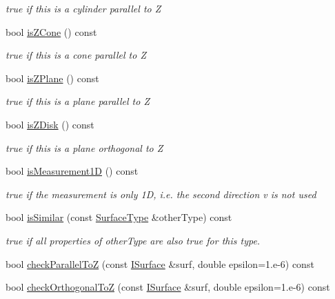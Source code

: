 \begin{DoxyCompactItemize}
\begin{DoxyCompactList}\small\item\em true if this is a cylinder parallel to Z \item\end{DoxyCompactList}\item 
bool \hyperlink{class_d_d_surfaces_1_1_surface_type_a545a4725a93ede9b1d5cab3cb3e55bf1}{isZCone} () const 
\begin{DoxyCompactList}\small\item\em true if this is a cone parallel to Z \item\end{DoxyCompactList}\item 
bool \hyperlink{class_d_d_surfaces_1_1_surface_type_ab440e93ce5a0bd8412d6cacd4e575321}{isZPlane} () const 
\begin{DoxyCompactList}\small\item\em true if this is a plane parallel to Z \item\end{DoxyCompactList}\item 
bool \hyperlink{class_d_d_surfaces_1_1_surface_type_a02a7fe9ec9f7ad6ebd98b0a1b36a39b3}{isZDisk} () const 
\begin{DoxyCompactList}\small\item\em true if this is a plane orthogonal to Z \item\end{DoxyCompactList}\item 
bool \hyperlink{class_d_d_surfaces_1_1_surface_type_accd1fdafbf7d6235ec1945af6347043a}{isMeasurement1D} () const 
\begin{DoxyCompactList}\small\item\em true if the measurement is only 1D, i.e. the second direction v is not used \item\end{DoxyCompactList}\item 
bool \hyperlink{class_d_d_surfaces_1_1_surface_type_a5c092596364989469d82af1268cea284}{isSimilar} (const \hyperlink{class_d_d_surfaces_1_1_surface_type}{SurfaceType} \&otherType) const 
\begin{DoxyCompactList}\small\item\em true if all properties of otherType are also true for this type. \item\end{DoxyCompactList}\item 
bool \hyperlink{class_d_d_surfaces_1_1_surface_type_aaf82c50cdbb7f1f896995431da719003}{checkParallelToZ} (const \hyperlink{class_d_d_surfaces_1_1_i_surface}{ISurface} \&surf, double epsilon=1.e-\/6) const 
\item 
bool \hyperlink{class_d_d_surfaces_1_1_surface_type_a9c98b2758bce1af96aa487bb0e131f6b}{checkOrthogonalToZ} (const \hyperlink{class_d_d_surfaces_1_1_i_surface}{ISurface} \&surf, double epsilon=1.e-\/6) const 
\end{DoxyCompactItemize}

